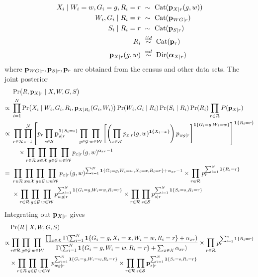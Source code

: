 \documentclass[11pt]{article}
\theoremstyle{plain}
\newcommand{\iid}{\mathrel{\stackrel{iid}{\sim}}}
\newcommand{\Dir}{\mathrm{Dir}}
\newcommand{\Cat}{\mathrm{Cat}}
\newcommand{\cW}{\mathcal{W}}
\newcommand{\cS}{\mathcal{S}}
\newcommand{\cR}{\mathcal{R}}
\newcommand{\cG}{\mathcal{G}}
\newcommand{\cX}{\mathcal{X}}
\begin{document}
\begin{align}
  X_i \mid W_i =w, G_i = g,  R_i = r \ &\sim \ \Cat(\vb p_{X|r}(g,w))  \\
  W_i, G_i \mid R_i  = r \ &\sim \ \Cat(\vb p_{WG|r}) \\
  S_i \mid R_i = r \ &\sim \ \Cat(\vb p_{S|r})  \\
  R_i \ &\iid \ \Cat(\vb p_r) \\
  \vb p_{X|r}(g,w) \ &\iid \ \Dir(\bm\alpha_{X|r})
\end{align}
where $\vb p_{WG|r}, \vb p_{S|r}, \vb p_r$ are obtained from the census and other
data sets.  The joint posterior
\begin{align}
  & \Pr(R, \vb p_{X|r} \mid X, W, G, S) \\
  \propto \ & \prod_{i=1}^N \Pr(X_i \mid W_i, G_i,
  R_i, \vb p_{X|R_i}(G_i, W_i))\Pr(W_i, G_i \mid R_i) \Pr(S_i \mid R_i) \Pr(R_i) \prod_{r
              \in \cR} P(\vb p_{X|r}) \\
  \propto \ & \prod_{r \in \cR} \prod_{i=1}^N  \left[p_r \prod_{s \in \cS}
              \vb p_{s|r}^{\mathbf{1}\{S_i = s\}} \prod_{g \in \cG} \prod_{w \in \cW}
             \left[ \left(\prod_{x \in \cX} p_{x|r}(g,w)^{\mathbf{1}\{X_i = x\}}\right)
              p_{wg|r}\right]^{\mathbf{1}\{G_i = g, W_i =
              w\}} \right]^{\mathbf{1}\{R_i = r\}} \\
  & \quad \times \prod_{r \in \cR} \prod_{x \in \cX} \prod_{g \in \cG}
    \prod_{w \in \cW} p_{x|r}(g,w)^{\alpha_{xr}-1} \\
  = \ &  \prod_{r \in \cR} \prod_{x \in \cX} \prod_{g \in \cG}
    \prod_{w \in \cW} p_{x|r}(g,w)^{\sum_{i=1}^N \mathbf{1}\{G_i = g,
        W_i = w, X_i = x, R_i = r\} + \alpha_{xr}-1} \times \prod_{r
        \in \cR} p_r^{\sum_{i=1}^N \mathbf{1}\{R_i = r\}} \\
  & \times \prod_{r \in \cR} \prod_{g \in \cG}
    \prod_{w \in \cW}p_{wg|r}^{\sum_{i=1}^N \mathbf{1}\{G_i = g,
        W_i = w, R_i = r\}} \times \prod_{r  \in \cR} \prod_{s \in \cS}
    p_{s|r}^{\sum_{i=1}^N \mathbf{1}\{S_i = s, R_i = r\}}
\end{align}
Integrating out $\vb p_{X|r}$ gives
\begin{align}
  &  \Pr(R \mid X, W, G, S) \\
\propto  & \prod_{r \in \cR} \prod_{g \in \cG}
    \prod_{w \in \cW} \frac{\prod_{x \in \cX}\Gamma(\sum_{i=1}^N \mathbf{1}\{G_i =
           g, X_i = x,  W_i = w, R_i = r\} + \alpha_{xr})}{\Gamma(\sum_{i=1}^N
           \mathbf{1}\{G_i = g,
           W_i = w, R_i = r\} + \sum_{x\in\cX} \alpha_{xr})} \times \prod_{r
        \in \cR} p_r^{\sum_{i=1}^n \mathbf{1}\{R_i = r\}} \\
  & \times \prod_{r \in \cR} \prod_{g \in \cG}
    \prod_{w \in \cW}p_{wg|r}^{\sum_{i=1}^N \mathbf{1}\{G_i = g,
        W_i = w, R_i = r\}} \times \prod_{r  \in \cR} \prod_{s \in \cS}
    \vb p_{s|r}^{\sum_{i=1}^N \mathbf{1}\{S_i = s, R_i = r\}}
\end{align}
\end{document}
